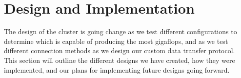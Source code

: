 

\chapter{Design  and Implementation}

The design of the cluster is going change as we test different configurations to determine which is capable of producing the most gigaflops, and as we test different connection methods as we design our custom data transfer protocol. This section will outline the different designs we have created, how they were implemented, and our plans for implementing future designs going forward.

